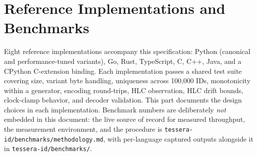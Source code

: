 \section{Reference Implementations and Benchmarks}
\label{sec:implementations}

Eight reference implementations accompany this specification: Python (canonical and performance-tuned variants), Go, Rust, TypeScript, C, C++, Java, and a CPython C-extension binding. Each implementation passes a shared test suite covering size, variant byte handling, uniqueness across 100{,}000 IDs, monotonicity within a generator, encoding round-trips, HLC observation, HLC drift bounds, clock-clamp behavior, and decoder validation. This part documents the design choices in each implementation. Benchmark numbers are deliberately \emph{not} embedded in this document: the live source of record for measured throughput, the measurement environment, and the procedure is \texttt{tessera-id/benchmarks/methodology.md}, with per-language captured outputs alongside it in \texttt{tessera-id/benchmarks/}.


